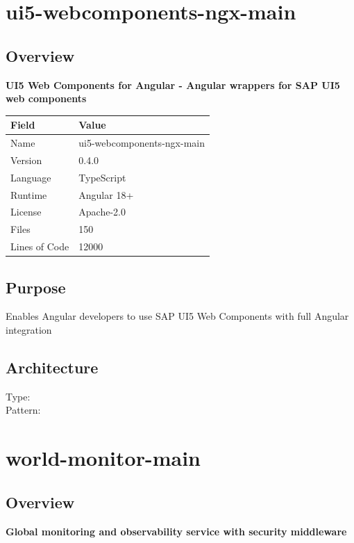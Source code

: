 \documentclass[11pt,a4paper]{article}
\begin{document}
\newpage


\section{ui5-webcomponents-ngx-main}

\subsection{Overview}

\textbf{UI5 Web Components for Angular - Angular wrappers for SAP UI5 web components}

\begin{tabular}{@{}ll@{}}
\toprule
\textbf{Field} & \textbf{Value} \\
\midrule
Name & ui5-webcomponents-ngx-main \\
Version & 0.4.0 \\
Language & TypeScript \\
Runtime & Angular 18+ \\
License & Apache-2.0 \\
Files & 150 \\
Lines of Code & 12000 \\
\bottomrule
\end{tabular}

\subsection{Purpose}
Enables Angular developers to use SAP UI5 Web Components with full Angular integration

\subsection{Architecture}
Type:  \\
Pattern: 



\newpage


\section{world-monitor-main}

\subsection{Overview}

\textbf{Global monitoring and observability service with security middleware}
\end{document}
